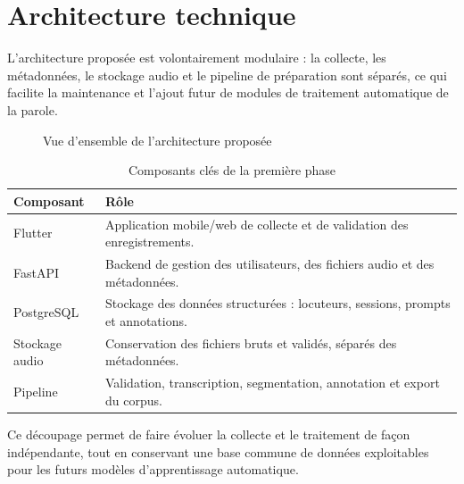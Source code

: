 \section{Architecture technique}

L'architecture proposée est volontairement modulaire : la collecte, les
métadonnées, le stockage audio et le pipeline de préparation sont
séparés, ce qui facilite la maintenance et l'ajout futur de modules de
traitement automatique de la parole.

\begin{figure}[H]
\centering
{}
\caption{Vue d'ensemble de l'architecture proposée}
\end{figure}

\begin{table}[H]
\centering
\begin{tabular}{p{3.2cm}p{9cm}}
\toprule
\textbf{Composant} & \textbf{Rôle} \\
\midrule
Flutter & Application mobile/web de collecte et de validation des enregistrements. \\
FastAPI & Backend de gestion des utilisateurs, des fichiers audio et des métadonnées. \\
PostgreSQL & Stockage des données structurées : locuteurs, sessions, prompts et annotations. \\
Stockage audio & Conservation des fichiers bruts et validés, séparés des métadonnées. \\
Pipeline & Validation, transcription, segmentation, annotation et export du corpus. \\
\bottomrule
\end{tabular}
\caption{Composants clés de la première phase}
\end{table}

Ce découpage permet de faire évoluer la collecte et le traitement de
façon indépendante, tout en conservant une base commune de données
exploitables pour les futurs modèles d'apprentissage automatique.